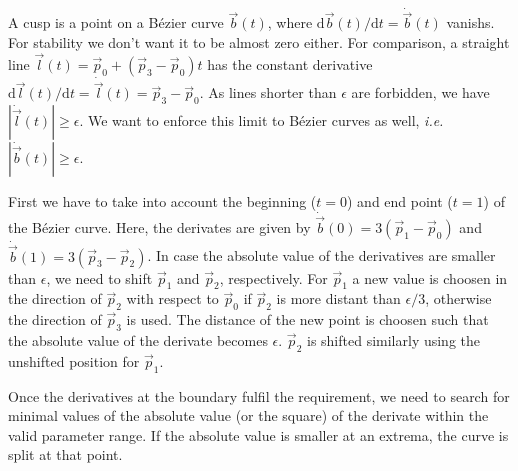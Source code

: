 \documentclass{article}
\begin{document}
A cusp is a point on a B\'ezier curve $\vec b(t)$, where
$\mathrm{d}\vec b(t)/\mathrm{d}t=\dot{\vec b}(t)$ vanishs.
For stability we don't want it to be almost zero either.
For comparison, a straight line
$\vec l(t)=\vec p_0 + (\vec p_3-\vec p_0)t$ has the constant derivative
$\mathrm{d}\vec l(t)/\mathrm{d}t = \dot{\vec l}(t) = \vec p_3-\vec p_0$.
As lines shorter than $\epsilon$ are forbidden, we have
$|\dot{\vec l}(t)| \ge \epsilon$. We want to enforce
this limit to B\'ezier curves as well, \emph{i.e.}
$|\dot{\vec b}(t)| \ge \epsilon$.

First we have to take into account the beginning ($t=0$) and end point
($t=1$) of the B\'ezier curve. Here, the derivates are given by
$\dot{\vec b}(0) = 3(\vec p_1-\vec p_0)$ and
$\dot{\vec b}(1) = 3(\vec p_3-\vec p_2)$. In case the absolute value
of the derivatives are smaller than $\epsilon$, we need to shift
$\vec p_1$ and $\vec p_2$, respectively. For $\vec p_1$ a new value is
choosen in the direction of $\vec p_2$ with respect to $\vec p_0$ if
$\vec p_2$ is more distant than $\epsilon/3$, otherwise the direction
of $\vec p_3$ is used. The distance of the new point is choosen such
that the absolute value of the derivate becomes $\epsilon$. $\vec p_2$
is shifted similarly using the unshifted position for $\vec p_1$.

Once the derivatives at the boundary fulfil the requirement, we need
to search for minimal values of the absolute value (or the square) of
the derivate within the valid parameter range. If the absolute value
is smaller at an extrema, the curve is split at that point.
\end{document}
